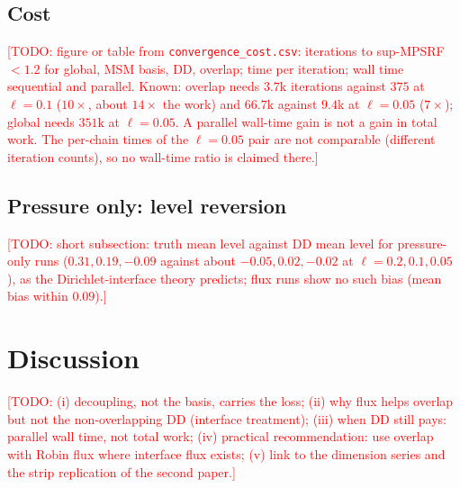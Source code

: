 \documentclass[11pt]{article}
\newcommand{\todo}[1]{\textcolor{red}{[TODO: #1]}}
\newcommand{\addfig}[1]{\iftoggle{annotations}{\par\noindent\textbf{\textcolor{annpurple}{[Let's add this figure/table/result here\ifx\relax#1\relax\else: #1\fi]}}\par}{}}
\begin{document}
\subsection{Cost}
\addfig{time per iteration, iterations to MPSRF $<1.2$ and wall time (sequential and parallel) for global, MSM, DD and overlap}
\todo{figure or table from \texttt{convergence\_cost.csv}: iterations to sup-MPSRF $<1.2$ for global, MSM basis, DD, overlap; time per iteration; wall time sequential and parallel. Known: overlap needs $3.7$k iterations against $375$ at $\ell=0.1$ ($10\times$, about $14\times$ the work) and $66.7$k against $9.4$k at $\ell=0.05$ ($7\times$); global needs $351$k at $\ell=0.05$. A parallel wall-time gain is not a gain in total work. The per-chain times of the $\ell=0.05$ pair are not comparable (different iteration counts), so no wall-time ratio is claimed there.}

\subsection{Pressure only: level reversion}
\todo{short subsection: truth mean level against DD mean level for pressure-only runs ($0.31,0.19,-0.09$ against about $-0.05, 0.02, -0.02$ at $\ell=0.2,0.1,0.05$), as the Dirichlet-interface theory predicts; flux runs show no such bias (mean bias within $0.09$).}

\section{Discussion}\label{sec:discussion}
\todo{(i) decoupling, not the basis, carries the loss; (ii) why flux helps overlap but not the non-overlapping DD (interface treatment); (iii) when DD still pays: parallel wall time, not total work; (iv) practical recommendation: use overlap with Robin flux where interface flux exists; (v) link to the dimension series and the strip replication of the second paper.}
\end{document}

